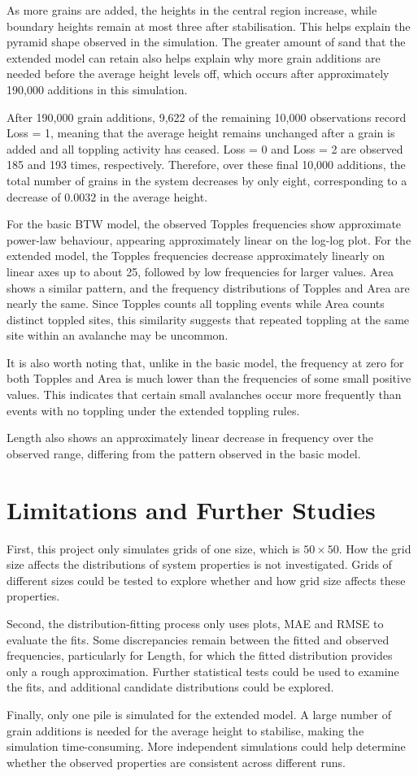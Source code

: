As more grains are added, the heights in the central region increase, while boundary heights remain at most three after stabilisation. This helps explain the pyramid shape observed in the simulation. The greater amount of sand that the extended model can retain also helps explain why more grain additions are needed before the average height levels off, which occurs after approximately 190,000 additions in this simulation.

After 190,000 grain additions, 9,622 of the remaining 10,000 observations record Loss = 1, meaning that the average height remains unchanged after a grain is added and all toppling activity has ceased. Loss = 0 and Loss = 2 are observed 185 and 193 times, respectively. Therefore, over these final 10,000 additions, the total number of grains in the system decreases by only eight, corresponding to a decrease of $0.0032$ in the average height. 

For the basic BTW model, the observed Topples frequencies show approximate power-law behaviour, appearing approximately linear on the log-log plot. For the extended model, the Topples frequencies decrease approximately linearly on linear axes up to about 25, followed by low frequencies for larger values. Area shows a similar pattern, and the frequency distributions of Topples and Area are nearly the same. Since Topples counts all toppling events while Area counts distinct toppled sites, this similarity suggests that repeated toppling at the same site within an avalanche may be uncommon. 

It is also worth noting that, unlike in the basic model, the frequency at zero for both Topples and Area is much lower than the frequencies of some small positive values. This indicates that certain small avalanches occur more frequently than events with no toppling under the extended toppling rules.
 
 Length also shows an approximately linear decrease in frequency over the observed range, differing from the pattern observed in the basic model.
 
\section{Limitations and Further Studies}

First, this project only simulates grids of one size, which is $50 \times 50$. How the grid size affects the distributions of system properties is not investigated. Grids of different sizes could be tested to explore whether and how grid size affects these properties.

Second, the distribution-fitting process only uses plots, MAE and RMSE to evaluate the fits. Some discrepancies remain between the fitted and observed frequencies, particularly for Length, for which the fitted distribution provides only a rough approximation. Further statistical tests could be used to examine the fits, and additional candidate distributions could be explored.

Finally, only one pile is simulated for the extended model. A large number of grain additions is needed for the average height to stabilise, making the simulation time-consuming. More independent simulations could help determine whether the observed properties are consistent across different runs.